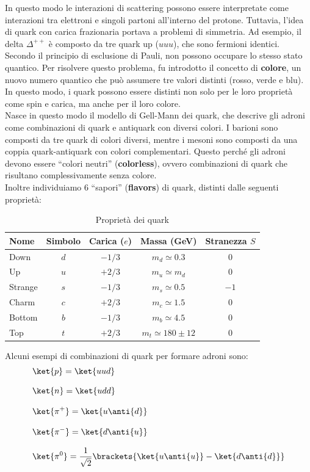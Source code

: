 In questo modo le interazioni di scattering possono essere interpretate come interazioni tra elettroni e singoli partoni all'interno del protone. Tuttavia, l'idea di quark con carica frazionaria portava a problemi di simmetria. Ad esempio, il delta $\Delta^{++}$ è composto da tre quark up ($uuu$), che sono fermioni identici. Secondo il principio di esclusione di Pauli, non possono occupare lo stesso stato quantico. Per risolvere questo problema, fu introdotto il concetto di \textbf{colore}, un nuovo numero quantico che può assumere tre valori distinti (rosso, verde e blu). In questo modo, i quark possono essere distinti non solo per le loro proprietà come spin e carica, ma anche per il loro colore.\\
Nasce in questo modo il modello di Gell-Mann dei quark, che descrive gli adroni come combinazioni di quark e antiquark con diversi colori. I barioni sono composti da tre quark di colori diversi, mentre i mesoni sono composti da una coppia quark-antiquark con colori complementari. Questo perché gli adroni devono essere ``colori neutri'' (\textbf{colorless}), ovvero combinazioni di quark che risultano complessivamente senza colore.\\
Inoltre individuiamo 6 ``sapori'' (\textbf{flavors}) di quark, distinti dalle seguenti proprietà:
\begin{table}[H]
    \centering
    \begin{tabular}{lcccc}
        \hline
        \textbf{Nome} & \textbf{Simbolo} & \textbf{Carica} ($e$) & \textbf{Massa} (GeV) & \textbf{Stranezza} $S$\\
        \hline
        Down & $d$ & $-1/3$ & $m_d \simeq 0.3$ & $0$\\[8pt]
        Up & $u$ & $+2/3$ & $m_u \simeq m_d$ & $0$\\[8pt]
        Strange & $s$ & $-1/3$ & $m_s \simeq 0.5$ & $-1$\\[8pt]
        Charm & $c$ & $+2/3$ & $m_c \simeq 1.5$ & $0$\\[8pt]
        Bottom & $b$ & $-1/3$ & $m_b \simeq 4.5$ & $0$\\[8pt]
        Top & $t$ & $+2/3$ & $m_t \simeq 180 \pm 12$ & $0$\\
        \hline
    \end{tabular}
    \caption{Proprietà dei quark}
\end{table}
Alcuni esempi di combinazioni di quark per formare adroni sono:
\begin{equation}
  \begin{split}
    &\ket{p} = \ket{uud} \\[8pt]
    &\ket{n} = \ket{udd} \\[8pt]
    &\ket{\pi^+} = \ket{u \anti{d}} \\[8pt]
    &\ket{\pi^-} = \ket{d \anti{u}} \\[8pt]
    &\ket{\pi^0} = \dfrac{1}{\sqrt{2}} \brackets{\ket{u \anti{u}} - \ket{d \anti{d}}}
  \end{split}
\end{equation}
